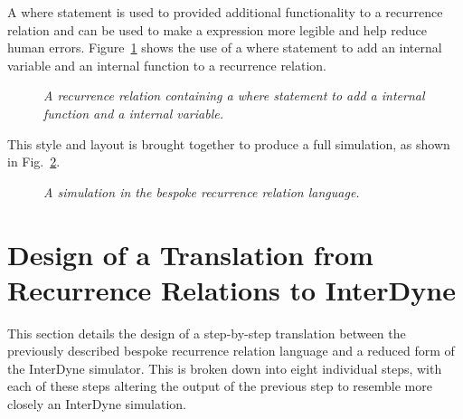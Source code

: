 \documentclass{article}
\begin{document}
A where statement is used to provided additional functionality to a recurrence relation and can be used to make a expression more legible and help reduce human errors. Figure~\ref{fig:7exofla} shows the use of a where statement to add an internal variable and an internal function to a recurrence relation. 
\begin{figure}[H]
	\centering
	
	\caption{\it A recurrence relation containing a where statement to add a internal function and a internal variable.  }
	\label{fig:7exofla}
\end{figure} 

This style and layout is brought together to produce a full simulation, as shown in Fig.~\ref{fig:8exofla}.
\begin{figure}[H]
	\centering
	
	\caption{\it A simulation in the bespoke recurrence relation language.}
	\label{fig:8exofla}
\end{figure} 






\newpage
\section{Design of a Translation from Recurrence Relations to InterDyne} 
This section details the design of a step-by-step translation between the previously described bespoke recurrence relation language and a reduced form of the InterDyne simulator. This is broken down into eight individual steps, with each of these steps altering the output of the previous step to resemble more closely an InterDyne simulation.
\end{document}
